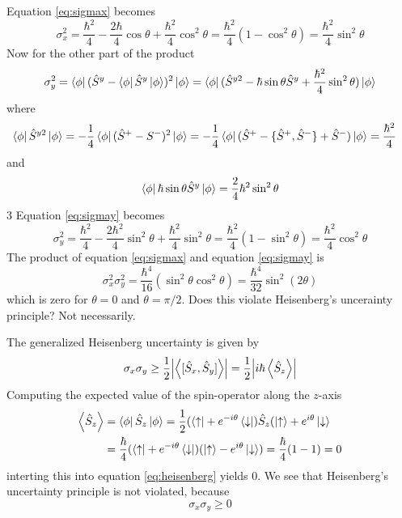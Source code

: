 \documentclass{article}
\begin{document}
Equation \ref{eq:sigmax} becomes
\begin{equation}
\sigma_x^2=\frac{\hbar^2}{4}-\frac{2\hbar}{4}\cos\theta+\frac{\hbar^2}{4}\cos^2\theta =
\frac{\hbar^2}{4}(1-\cos^2\theta)=\frac{\hbar^2}{4}\sin^2\theta
\end{equation}
Now for the other part of the product
\begin{equation}
\label{eq:sigmay}
\sigma_y^2=\bra{\phi}(\hat{S}^y-\bra{\phi}\hat{S}^y\ket{\phi})^2\ket{\phi} =
\bra{\phi}(\hat{S}^{y2}-\hbar\sin\theta\hat{S}^y+\frac{\hbar^2}{4}\sin^2\theta)\ket{\phi}
\end{equation}
where
\begin{align*}
\bra{\phi}\hat{S}^{y2}\ket{\phi} &= -\frac{1}{4}\bra{\phi}(\hat{S}^+ - S^-)^2\ket{\phi}
=-\frac{1}{4}\bra{\phi}(\hat{S}^+-\{\hat{S}^+,\hat{S}^-\}+\hat{S}^-)\ket{\phi} = \frac{\hbar^2}{4}
\end{align*}
and
\begin{equation*}
\bra{\phi}\hbar\sin\theta\hat{S}^y\ket{\phi} = \frac{2}{4}\hbar^2\sin^2\theta
\end{equation*}3
Equation \ref{eq:sigmay} becomes
\begin{equation}
\sigma_y^2 = \frac{\hbar^2}{4}-\frac{2\hbar^2}{4}\sin^2\theta+\frac{\hbar^2}{4}\sin^2\theta =
\frac{\hbar^2}{4}(1-\sin^2\theta)=\frac{\hbar^2}{4}\cos^2\theta
\end{equation}
The product of equation \ref{eq:sigmax} and equation \ref{eq:sigmay} is
\begin{equation}
\label{eq:heisenbergish}
\sigma_x^2\sigma_y^2=\frac{\hbar^4}{16}(\sin^2\theta\cos^2\theta)=\frac{\hbar^4}{32}\sin^2{(2\theta)}
\end{equation}
which is zero for $\theta=0$ and $\theta=\pi/2$. Does this violate Heisenberg's uncerainty principle? Not necessarily.

The generalized Heisenberg uncertainty is given by 
\begin{equation}
\label{eq:heisenberg}
\sigma_x\sigma_y \geq \frac{1}{2}\abs{\ev{[\hat{S}_x,\hat{S}_y]}}=\frac{1}{2}\abs{i\hbar\ev{\hat{S}_z}}
\end{equation}
Computing the expected value of the spin-operator along the $z$-axis
\begin{align*}
\ev{\hat{S}_z}&=\bra{\phi}\hat{S}_z\ket{\phi} = \frac{1}{2}(\bra{\uparrow}+e^{-i\theta}\bra{\downarrow})\hat{S}_z(\ket{\uparrow}+e^{i\theta}\ket{\downarrow} \\
&= \frac{\hbar}{4}(\bra{\uparrow} + e^{-i\theta}\bra{\downarrow})(\ket{\uparrow}-e^{i\theta}\ket{\downarrow}) = \frac{\hbar}{4}(1-1)=0
\end{align*}
interting this into equation \ref{eq:heisenberg} yields 0. We see that Heisenberg's uncertainty principle is not violated, because 
\begin{equation}
\sigma_x\sigma_y \geq 0
\end{equation}
\end{document}
